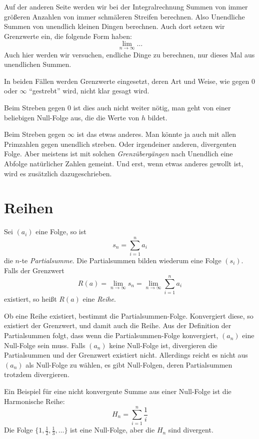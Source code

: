 Auf der anderen Seite werden wir bei der Integralrechnung Summen von immer größeren Anzahlen von immer schmäleren Streifen berechnen. Also Unendliche Summen von unendlich kleinen Dingen berechnen. Auch dort setzen wir Grenzwerte ein, die folgende Form haben:
\begin{equation}
\lim\limits_{n \rightarrow \infty} \dots
\end{equation}
Auch hier werden wir versuchen, endliche Dinge zu berechnen, nur dieses Mal aus unendlichen Summen. 

In beiden Fällen werden Grenzwerte eingesetzt, deren Art und Weise, wie gegen $0$ oder $\infty$ "`gestrebt"' wird, nicht klar gesagt wird. 

Beim Streben gegen $0$ ist dies auch nicht weiter nötig, man geht von einer beliebigen Null-Folge aus, die die Werte von $h$ bildet. 

Beim Streben gegen $\infty$ ist das etwas anderes. Man könnte ja auch mit allen Primzahlen gegen unendlich streben. Oder irgendeiner anderen, divergenten Folge. Aber meistens ist mit solchen \emph{Grenzübergängen} nach Unendlich eine Abfolge natürlicher Zahlen gemeint. Und erst, wenn etwas anderes gewollt ist, wird es zusätzlich dazugeschrieben.

\section{Reihen}

\begin{definition}
Sei $(a_i)$ eine Folge, so ist 
\[
s_n = \sum_{i=1}^{n} a_i
\]
die $n$-te \emph{Partialsumme}. Die Partialsummen bilden wiederum eine Folge $(s_i)$. Falls der Grenzwert 
\[
R(a) = \lim_{n\rightarrow \infty} s_n = \lim_{n\rightarrow \infty} \sum_{i=1}^{n} a_i
\]
existiert, so heißt $R(a)$ eine \emph{Reihe}.
\end{definition}

Ob eine Reihe existiert, bestimmt die Partialsummen-Folge. Konvergiert diese, so existiert der Grenzwert, und damit auch die Reihe. Aus der Definition der Partialsummen folgt, dass wenn die Partialsummen-Folge konvergiert, $(a_n)$ eine Null-Folge sein muss. Falls $(a_n)$ keine Null-Folge ist, divergieren die Partialsummen und der Grenzwert  existiert nicht. Allerdings reicht es nicht aus $(a_n)$ als Null-Folge zu wählen, es gibt Null-Folgen, deren Partialsummen trotzdem divergieren. 

Ein Beispiel für eine nicht konvergente Summe aus einer Null-Folge ist die Harmonische Reihe:
\[
H_n = \sum_{i=1}^{n} \frac{1}{i}
\]
Die Folge $\lbrace 1, \frac{1}{2}, \frac{1}{3}, \dots \rbrace$ ist eine Null-Folge, aber die $H_n$ sind divergent.

